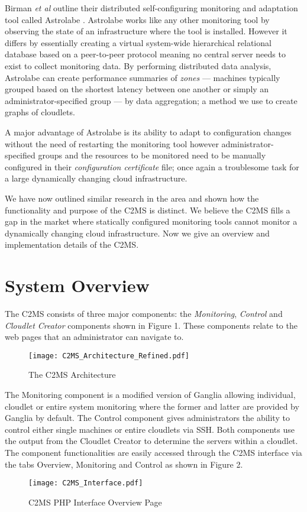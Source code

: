 \documentclass[10pt, conference, compsocconf]{IEEEtran}
\begin{document}
Birman \textit{et al} outline their distributed self-configuring monitoring and adaptation tool called Astrolabe \cite{Birman2003}. Astrolabe works like any other monitoring tool by observing the state of an infrastructure where the tool is installed.  However it differs by essentially creating a virtual system-wide hierarchical relational database based on a peer-to-peer protocol meaning no central server needs to exist to collect monitoring data. By performing distributed data analysis, Astrolabe can create performance summaries of \textit{zones} --- machines typically grouped based on the shortest latency between one another or simply an administrator-specified group --- by data aggregation; a method we use to create graphs of cloudlets.

A major advantage of Astrolabe is its ability to adapt to configuration changes without the need of restarting the monitoring tool however administrator-specified groups and the resources to be monitored need to be manually configured in their \textit{configuration certificate} file; once again a troublesome task for a large dynamically changing cloud infrastructure. 

We have now outlined similar research in the area and shown how the functionality and purpose of the C2MS is distinct. We believe the C2MS fills a gap in the market where statically configured monitoring tools cannot monitor a dynamically changing cloud infrastructure. Now we give an overview and implementation details of the C2MS.

\section{System Overview}
The C2MS consists of three major components: the \textit{Monitoring}, \textit{Control} and \textit{Cloudlet Creator} components shown in Figure 1. These components relate to the web pages that an administrator can navigate to. 
\vspace{-1em}
\begin{figure}[h!]
\centering
\texttt{[image: C2MS\_Architecture\_Refined.pdf]}
\caption{The C2MS Architecture} 
\end{figure}

The Monitoring component is a modified version of Ganglia allowing individual, cloudlet or entire system monitoring where the former and latter are provided by Ganglia by default. The Control component gives administrators the ability to control either single machines or entire cloudlets via SSH. Both components use the output from the Cloudlet Creator to determine the servers within a cloudlet. The component functionalities are easily accessed through the C2MS interface via the tabs Overview, Monitoring and Control as shown in Figure 2.
\vspace{-0.4em}
\begin{figure}[ht]
\centering
\texttt{[image: C2MS\_Interface.pdf]}
\caption{C2MS PHP Interface Overview Page}
\end{figure}
\end{document}
